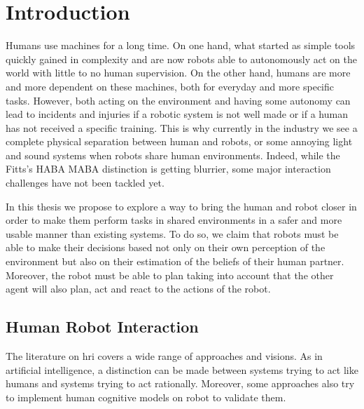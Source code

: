 \documentclass[a4paper,11pt,twoside]{StyleThese}
\begin{document}
\fi


\chapter*{Introduction}
Humans use machines for a long time. On one hand, what started as simple tools quickly gained in complexity and are now robots able to autonomously act on the world with little to no human supervision. On the other hand, humans are more and more dependent on these machines, both for everyday and more specific tasks.
However, both acting on the environment and having some autonomy can lead to incidents and injuries if a robotic system is not well made or if a human has not received a specific training. This is why currently in the industry we see a complete physical separation between human and robots, or some annoying light and sound systems when robots share human environments. Indeed, while the Fitts's HABA MABA \cite{fitts_human_1951} distinction is getting blurrier, some major interaction challenges have not been tackled yet.

In this thesis we propose to explore a way to bring the human and robot closer in order to make them perform tasks in shared environments in a safer and more usable manner than existing systems. To do so, we claim that robots must be able to make their decisions based not only on their own perception of the environment but also on their estimation of the beliefs of their human partner. Moreover, the robot must be able to plan taking into account that the other agent will also plan, act and react to the actions of the robot.

\section*{Human Robot Interaction}
The literature on \acrlong{hri} covers a wide range of approaches and visions. As in artificial intelligence, a distinction can be made between systems trying to act like humans and systems trying to act rationally. Moreover, some approaches also try to implement human cognitive models on robot to validate them. %
\end{document}
